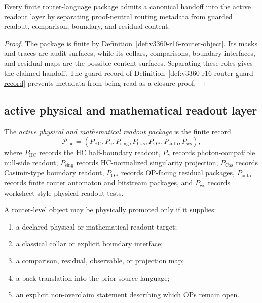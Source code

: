 \begin{theorem}
\label{thm:v3360-r16-canonical-router-handoff}
Every finite router-language package admits a canonical handoff into the active readout layer by separating proof-neutral routing metadata from guarded readout, comparison, boundary, and residual content.
\end{theorem}

\begin{proof}
The package is finite by Definition~\ref{def:v3360-r16-router-object}. Its masks and traces are audit surfaces, while its collars, comparisons, boundary interfaces, and residual maps are the possible content surfaces. Separating these roles gives the claimed handoff. The guard record of Definition~\ref{def:v3360-r16-router-guard-record} prevents metadata from being read as a closure proof.
\end{proof}

\subsection*{active physical and mathematical readout layer}
\label{subsec:v3360-r16-active-physical-mathematical-readout-layer}

\begin{definition}
\label{def:v3360-r16-active-readout-package}
The \emph{active physical and mathematical readout package} is the finite record
\[
 \mathcal P_{\mathrm{loc}}
 =
 (P_{\mathrm{HC}},P_{\gamma},P_{\mathrm{sing}},P_{\mathrm{Cas}},P_{\mathrm{OP}},P_{\mathrm{auto}},P_{\mathrm{ws}}),
\]
where $P_{\mathrm{HC}}$ records the HC half-boundary readout, $P_{\gamma}$ records photon-compatible null-side readout, $P_{\mathrm{sing}}$ records HC-normalized singularity projection, $P_{\mathrm{Cas}}$ records Casimir-type boundary readout, $P_{\mathrm{OP}}$ records OP-facing residual packages, $P_{\mathrm{auto}}$ records finite router automaton and bitstream packages, and $P_{\mathrm{ws}}$ records worksheet-style physical readout tests.
\end{definition}

\begin{definition}
\label{def:v3360-r16-physical-promotion-criterion}
A router-level object may be physically promoted only if it supplies:
\begin{enumerate}[leftmargin=*]
 \item a declared physical or mathematical readout target;
 \item a classical collar or explicit boundary interface;
 \item a comparison, residual, observable, or projection map;
 \item a back-translation into the prior source language;
 \item an explicit non-overclaim statement describing which OPs remain open.
\end{enumerate}
\end{definition}

